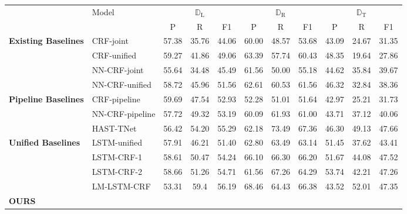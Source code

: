 \documentclass[letterpaper]{article} %
\begin{document}
\begin{table}[]
    \centering
    \begin{tabular}{ll|ccc|ccc|ccc}
    \Xhline{3\arrayrulewidth}
        & \multirow{2}{*}{Model} & \multicolumn{3}{c|}{$\mathbb{D}_{\text{L}}$} & \multicolumn{3}{c|}{$\mathbb{D}_{\text{R}}$} & \multicolumn{3}{c}{$\mathbb{D}_{\text{T}}$}\\ \cline{3-11} 
        & & P & R & F1 & P & R & F1 & P & R & F1 \\ \hline \hline
        \multirow{4}{*}{\textbf{Existing Baselines}} & CRF-joint & 57.38 & 35.76 & 44.06 & 60.00 & 48.57 & 53.68 & 43.09 & 24.67 & 31.35 \\
        & CRF-unified & 59.27 & 41.86 & 49.06 & 63.39 & 57.74 & 60.43 & 48.35 & 19.64 & 27.86 \\ 
        & NN-CRF-joint & 55.64 & 34.48 & 45.49 & 61.56 & 50.00 & 55.18 & 44.62 & 35.84 & 39.67 \\
        & NN-CRF-unified & 58.72 & 45.96 & 51.56 & 62.61 & 60.53 & 61.56 & 46.32 & 32.84 & 38.36 \\ \hline
        \multirow{3}{*}{\textbf{Pipeline Baselines}} & CRF-pipeline & 59.69 & 47.54 & 52.93 & 52.28 & 51.01 & 51.64 & 42.97 & 25.21 & 31.73 \\
        & NN-CRF-pipeline & 57.72 & 49.32 & 53.19 & 60.09 & 61.93 & 61.00 & 43.71 & 37.12 & 40.06 \\
        & HAST-TNet & 56.42 & 54.20 & 55.29 & 62.18 & 73.49 & 67.36 & 46.30 & 49.13 & 47.66 \\ \hline
        \multirow{4}{*}{\textbf{Unified Baselines}} & LSTM-unified & 57.91 & 46.21 & 51.40 & 62.80 & 63.49 & 63.14 & 51.45 & 37.62 & 43.41 \\
        &LSTM-CRF-1 & 58.61 & 50.47 & 54.24 & 66.10 & 66.30 & 66.20 & 51.67 & 44.08 & 47.52 \\
        & LSTM-CRF-2 & 58.66 & 51.26 & 54.71 & 61.56 & 67.26 & 64.29 & 53.74 & 42.21 & 47.26 \\
        & LM-LSTM-CRF & 53.31 & 59.4 & 56.19 & 68.46 & 64.43 & 66.38 & 43.52 & 52.01 & 47.35 \\ \hline
        \multirow{5}{*}{\textbf{OURS}}  

\end{tabular}
\end{table}
\end{document}
